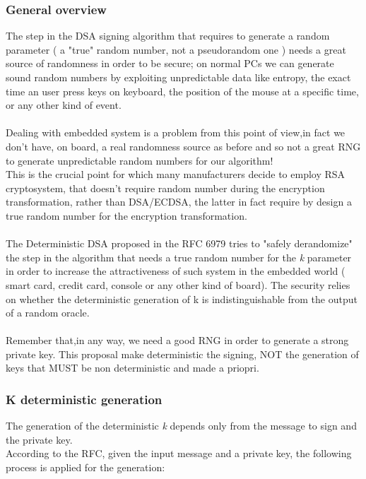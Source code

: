 \documentclass[11pt,english]{article}
\begin{document}
\subsubsection{General overview}
The step in the DSA signing algorithm that requires to generate a random parameter ( a "true" random number, not a pseudorandom one ) needs a great source of randomness in order to be secure; on normal PCs we can generate sound random numbers by exploiting unpredictable data like entropy, the exact time an user press keys on keyboard, the position of the mouse at a specific time, or any other kind of event. \\\\Dealing with embedded system is a problem from this point of view,in fact we don't have, on board, a real randomness source as before and so not a great RNG to generate unpredictable random numbers for our algorithm! \\This is the crucial point for which many manufacturers decide to employ RSA cryptosystem, that doesn't require random number during the encryption transformation, rather than DSA/ECDSA, the latter in fact require by design a true random number for the encryption transformation.\\
\\The Deterministic DSA proposed in the RFC 6979\cite{rfc} tries to "safely derandomize" the step in the algorithm that needs a true random number for the \textit{k} parameter in order to increase the attractiveness of such system in the embedded world ( smart card, credit card, console or any other kind of board). The security relies on whether the deterministic generation of k is indistinguishable from the output of a random oracle.\\\\
Remember that,in any way, we need a good RNG in order to generate a strong private key. 
This proposal make deterministic the signing, NOT the generation of keys that MUST be non deterministic and made a priopri.


\subsubsection{K deterministic generation}

The generation of the deterministic \textit{k} depends only from the message to sign and the private key.\\
According to the RFC, given the input message and a private key, the following process is applied for the generation:
\end{document}

